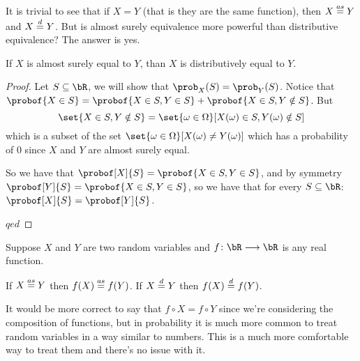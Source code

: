 It is trivial to see that if $X=Y$ (that is they are the same function), then $X\mathrel{\overset{as}=} Y$ and $X\mathrel{\overset d=} Y$.
But is almost surely equivalence more powerful than distributive equivalence?
The answer is yes.

\begin{prop*}

	If $X$ is almost surely equal to $Y$, than $X$ is distributively equal to $Y$.

\end{prop*}

\begin{proof}

	Let $S\subseteq\bR$, we will show that $\prob_X(S)=\prob_Y(S)$.
	Notice that $\probof{X\in S}=\probof{X\in S, Y\in S} + \probof{X\in S, Y\notin S}$.
	But
	\[ \set{X\in S, Y\notin S}=\set{\omega\in\Omega}[X(\omega)\in S, Y(\omega)\notin S] \]
	which is a subset of the set
	$\set{\omega\in\Omega}[X(\omega)\neq Y(\omega)]$ which has a probability of $0$ since $X$ and $Y$ are almost surely equal.

	So we have that $\probof[X]{S} = \probof{X\in S, Y\in S}$, and by symmetry $\probof[Y]{S} = \probof{X\in S, Y\in S}$, so we have
	that for every $S\subseteq\bR$: $\probof[X]{S}=\probof[Y]{S}$.

\hfill$qed$

\end{proof}

\begin{prop*}

	Suppose $X$ and $Y$ are two random variables and $f\colon\bR\longrightarrow\bR$ is any real function.
	\begin{msecenumerate}
		\mitem If $X\mathrel{\overset{as}=} Y$ then $f(X)\mathrel{\overset{as}=} f(Y)$.
		\mitem If $X\mathrel{\overset d=} Y$ then $f(X)\mathrel{\overset d=} f(Y)$.
	\end{msecenumerate}

\end{prop*}

\begin{note}

	It would be more correct to say that $f\circ X=f\circ Y$ since we're considering the composition of functions, but in probability
	it is much more common to treat random variables in a way similar to numbers.
	This is a much more comfortable way to treat them and there's no issue with it.

\end{note}

